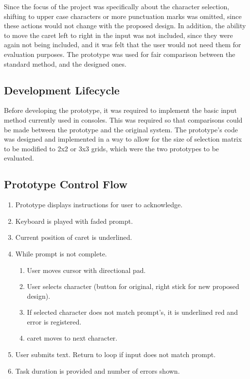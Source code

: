 \documentclass[prototype.tex]{subfiles}
\begin{document}
Since the focus of the project was specifically about the character selection,
shifting to upper case characters or more punctuation marks was omitted, since
these actions would not change with the proposed design. In addition, the
ability to move the caret left to right in the input was not included, since
they were again not being included, and it was felt that the user would not
need them for evaluation purposes. The prototype was used for fair comparison
between the standard method, and the designed ones.

\subsection{Development Lifecycle} %
\label{sub:development_lifecycle}
Before developing the prototype, it was required to implement the basic input
method currently used in consoles. This was required so that comparisons could
be made between the prototype and the original system. The prototype's code was
designed and implemented in a way to allow for the size of selection matrix to
be modified to 2x2 or 3x3 grids, which were the two prototypes to be evaluated.

\subsection{Prototype Control Flow} %
\label{sub:prototype_control_flow}
\begin{enumerate}
	\item Prototype displays instructions for user to acknowledge.
	\item Keyboard is played with faded prompt.
	\item Current position of caret is underlined.
	\item While prompt is not complete.
	\begin{enumerate}
		\item User moves cursor with directional pad.
		\item User selects character (button for original, right stick for
		new proposed design).
		\item If selected character does not match prompt's, it is underlined
		red and error is registered.
		\item caret moves to next character.
	\end{enumerate}
	\item User submits text. Return to loop if input does not match prompt.
	\item Task duration is provided and number of errors shown.
\end{enumerate}
\end{document}

